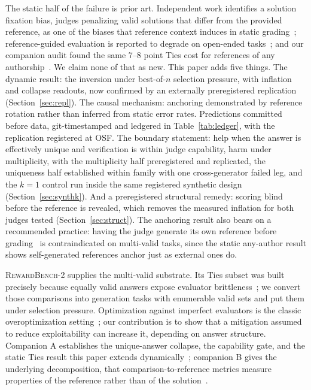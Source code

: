 \documentclass[11pt]{article}
\begin{document}
The static half of the failure is prior art.
Independent work identifies a solution fixation bias, judges penalizing valid solutions that differ from the provided reference, as one of the biases that reference context induces in static grading~\cite{fixation2025}; reference-guided evaluation is reported to degrade on open-ended tasks~\cite{judgingref2026}; and our companion audit found the same $7$--$8$ point Ties cost for references of any authorship~\cite{companionA}.
We claim none of that as new.
This paper adds five things.
The dynamic result: the inversion under best-of-$n$ selection pressure, with inflation and collapse readouts, now confirmed by an externally preregistered replication (Section~\ref{sec:repl}).
The causal mechanism: anchoring demonstrated by reference rotation rather than inferred from static error rates.
Predictions committed before data, git-timestamped and ledgered in Table~\ref{tab:ledger}, with the replication registered at OSF.
The boundary statement: help when the answer is effectively unique and verification is within judge capability, harm under multiplicity, with the multiplicity half preregistered and replicated, the uniqueness half established within family with one cross-generator failed leg, and the $k{=}1$ control run inside the same registered synthetic design (Section~\ref{sec:synthk}).
And a preregistered structural remedy: scoring blind before the reference is revealed, which removes the measured inflation for both judges tested (Section~\ref{sec:struct}).
The anchoring result also bears on a recommended practice: having the judge generate its own reference before grading~\cite{dobefore2025} is contraindicated on multi-valid tasks, since the static any-author result shows self-generated references anchor just as external ones do.

\textsc{RewardBench-2} supplies the multi-valid substrate.
Its Ties subset was built precisely because equally valid answers expose evaluator brittleness~\cite{malik2025rewardbench2}; we convert those comparisons into generation tasks with enumerable valid sets and put them under selection pressure.
Optimization against imperfect evaluators is the classic overoptimization setting~\cite{gao2022scaling}; our contribution is to show that a mitigation assumed to reduce exploitability can increase it, depending on answer structure.
Companion A establishes the unique-answer collapse, the capability gate, and the static Ties result this paper extends dynamically~\cite{companionA}; companion B gives the underlying decomposition, that comparison-to-reference metrics measure properties of the reference rather than of the solution~\cite{companionB}.
\end{document}
